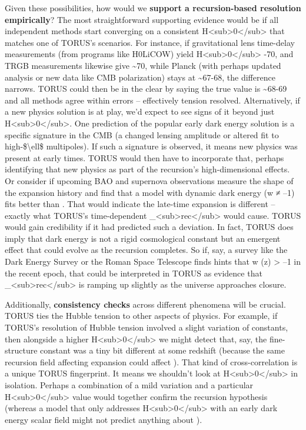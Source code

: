 \documentclass[
]{article}
\begin{document}
Given these possibilities, how would we \textbf{support a
recursion-based resolution empirically}? The most straightforward
supporting evidence would be if all independent methods start converging
on a consistent H\textless sub\textgreater0\textless/sub\textgreater{}
that matches one of TORUS's scenarios. For instance, if gravitational
lens time-delay measurements (from programs like H0LiCOW) yield
H\textless sub\textgreater0\textless/sub\textgreater{} -70, and TRGB
measurements likewise give \textasciitilde70, while Planck (with perhaps
updated analysis or new data like CMB polarization) stays at
\textasciitilde67-68, the difference narrows. TORUS could then be in the
clear by saying the true value is \textasciitilde68-69 and all methods
agree within errors -- effectively tension resolved. Alternatively, if a
new physics solution is at play, we'd expect to see signs of it beyond
just H\textless sub\textgreater0\textless/sub\textgreater. One
prediction of the popular early dark energy solution is a specific
signature in the CMB (a changed lensing amplitude or altered fit to
high-\$\textbackslash ell\$ multipoles). If such a signature is
observed, it means new physics was present at early times. TORUS would
then have to incorporate that, perhaps identifying that new physics as
part of the recursion's high-dimensional effects. Or consider if
upcoming BAO and supernova observations measure the shape of the
expansion history and find that a model with dynamic dark energy (w ≠
--1) fits better than \LambdaCDM. That would indicate the late-time expansion
is different -- exactly what TORUS's time-dependent
\Lambda\_\textless sub\textgreater rec\textless/sub\textgreater{} would cause.
TORUS would gain credibility if it had predicted such a deviation. In
fact, TORUS does imply that dark energy is not a rigid cosmological
constant but an emergent effect that could evolve as the recursion
completes\hspace{0pt}. So if, say, a survey like the Dark Energy Survey
or the Roman Space Telescope finds hints that w (z) \textgreater{} --1
in the recent epoch, that could be interpreted in TORUS as evidence that
\Lambda\_\textless sub\textgreater rec\textless/sub\textgreater{} is ramping
up slightly as the universe approaches closure.

Additionally, \textbf{consistency checks} across different phenomena
will be crucial. TORUS ties the Hubble tension to other aspects of
physics. For example, if TORUS's resolution of Hubble tension involved a
slight variation of constants, then alongside a higher
H\textless sub\textgreater0\textless/sub\textgreater{} we might detect
that, say, the fine-structure constant was a tiny bit different at some
redshift (because the same recursion field affecting expansion could
affect \alpha). That kind of cross-correlation is a unique TORUS fingerprint.
It means we shouldn't look at
H\textless sub\textgreater0\textless/sub\textgreater{} in isolation.
Perhaps a combination of a mild \alpha variation and a particular
H\textless sub\textgreater0\textless/sub\textgreater{} value would
together confirm the recursion hypothesis (whereas a model that only
addresses H\textless sub\textgreater0\textless/sub\textgreater{} with an
early dark energy scalar field might not predict anything about \alpha).
\end{document}

